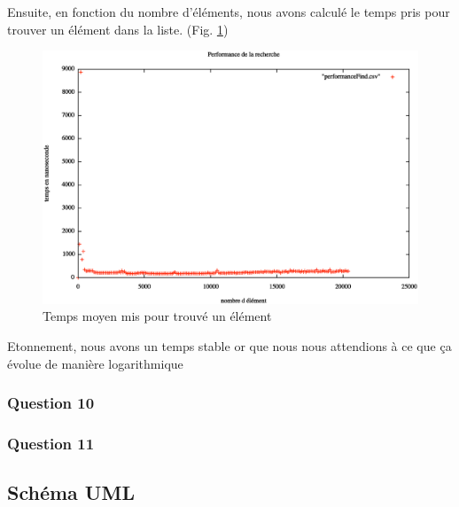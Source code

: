 \documentclass[a4paper]{article}
\begin{document}
Ensuite, en fonction du nombre d'éléments, nous avons calculé le temps pris pour trouver un élément dans la liste. (Fig. \ref{perfoFind})

\begin{figure} [H]
\begin{center}
\includegraphics[scale=0.4]{performanceFind.eps}
\caption{Temps moyen mis pour trouvé un élément}
\label{perfoFind}
\end{center}
\end{figure}

Etonnement, nous avons un temps stable or que nous nous attendions à ce que ça évolue de manière logarithmique

\subsubsection*{Question 10}


\subsubsection*{Question 11}


\subsection*{Schéma UML}
\end{document}
